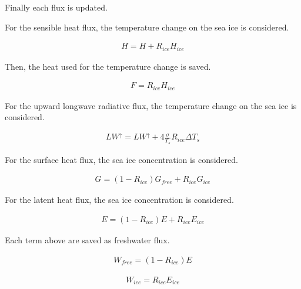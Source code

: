 Finally each flux is updated.

For the sensible heat flux, the temperature change on the sea ice is
considered.

\begin{eqnarray}
    H=H+ R_{ice}  H_{ice}
\end{eqnarray}

Then, the heat used for the temperature change is saved.

\begin{eqnarray}
    F = R_{ice} H_{ice}
\end{eqnarray}

For the upward longwave radiative flux, the temperature change on the
sea ice is considered.

\begin{eqnarray}
    LW^\uparrow=LW^\uparrow +  4\frac{\sigma}{T_s}R_{ice}  \Delta T_s
\end{eqnarray}

For the surface heat flux, the sea ice concentration is considered.

\begin{eqnarray}
    G=(1-R_{ice})G_{free} + R_{ice}G_{ice}
\end{eqnarray}

For the latent heat flux, the sea ice concentration is considered.

\begin{eqnarray}
    E=(1-R_{ice})E + R_{ice}E_{ice}
\end{eqnarray}

Each term above are saved as freshwater flux.

\begin{eqnarray}
    W_{free} = (1-R_{ice}) E
\end{eqnarray}

\begin{eqnarray}
    W_{ice} = R_{ice} E_{ice}
\end{eqnarray}
